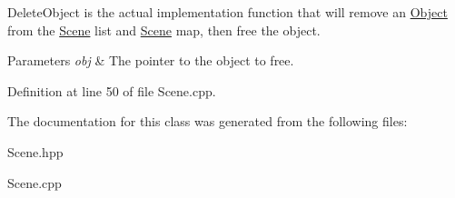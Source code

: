 Delete\-Object is the actual implementation function that will remove an \hyperlink{class_object}{Object} from the \hyperlink{class_scene}{Scene} list and \hyperlink{class_scene}{Scene} map, then free the object. 


\begin{DoxyParams}{Parameters}
{\em obj} & The pointer to the object to free. \\
\hline
\end{DoxyParams}


Definition at line 50 of file Scene.\-cpp.



The documentation for this class was generated from the following files\-:\begin{DoxyCompactItemize}
\item 
Scene.\-hpp\item 
Scene.\-cpp\end{DoxyCompactItemize}
